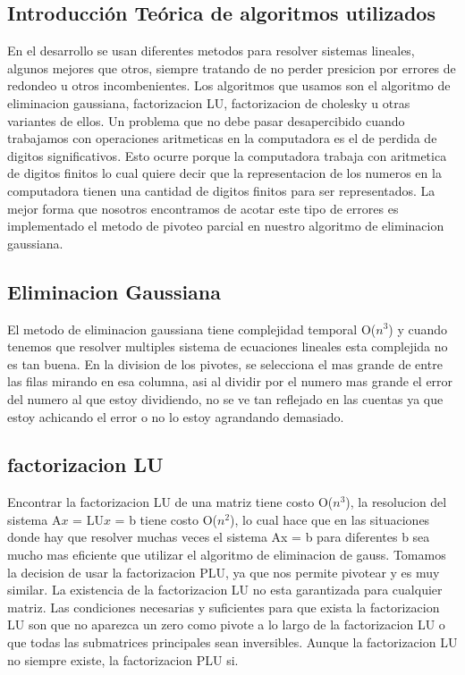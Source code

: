 \subsection{Introducción Teórica de algoritmos utilizados}

En el desarrollo se usan diferentes metodos para resolver sistemas lineales, algunos mejores que otros, siempre tratando de no perder presicion por errores de redondeo u otros incombenientes.
Los algoritmos que usamos son el algoritmo de eliminacion gaussiana, factorizacion LU, factorizacion de cholesky u otras variantes de ellos.
Un problema que no debe pasar desapercibido cuando trabajamos con operaciones aritmeticas en la computadora es el de perdida de digitos significativos. Esto ocurre porque la computadora trabaja con aritmetica de digitos finitos lo cual quiere decir que la representacion de los numeros en la computadora tienen una cantidad de digitos finitos para ser representados.
La mejor forma que nosotros encontramos de acotar este tipo de errores es implementado el metodo de pivoteo parcial en nuestro algoritmo de eliminacion gaussiana.

\subsection{Eliminacion Gaussiana}
El metodo de eliminacion gaussiana tiene complejidad temporal O($n^{3}$) y cuando tenemos que resolver multiples sistema de ecuaciones lineales esta complejida no es tan buena.
En la division de los pivotes, se selecciona el mas grande de entre las filas mirando en esa columna, asi al dividir por el numero mas grande el error del numero al que estoy dividiendo, no se ve tan reflejado en las cuentas ya que estoy achicando el error o no lo estoy agrandando demasiado.


\subsection{factorizacion LU}
Encontrar la factorizacion LU de una matriz tiene costo O($n^{3}$), la resolucion del sistema A$x$ = LU$x$ = b tiene costo O($n^{2}$), lo cual hace que en las situaciones donde hay que resolver muchas veces el sistema Ax = b para diferentes b sea mucho mas eficiente que utilizar el algoritmo de eliminacion de gauss. 
Tomamos la decision de usar la factorizacion PLU, ya que nos permite pivotear y es muy similar. 
La existencia de la factorizacion LU no esta garantizada para cualquier matriz. Las condiciones necesarias y suficientes para que exista la factorizacion LU son que no aparezca un zero como pivote a lo largo de la factorizacion LU o que todas las submatrices principales sean inversibles. Aunque la factorizacion LU no siempre existe, la factorizacion PLU si.


